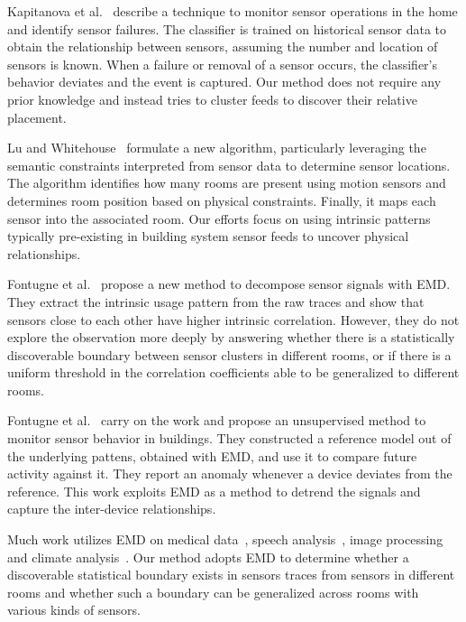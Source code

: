 Kapitanova et al.~\cite{failure} describe a technique to monitor sensor operations in the home and identify sensor failures. 
The classifier is trained on historical sensor data to obtain the relationship between sensors, assuming the number and location of 
sensors is known.  When a failure or removal of a sensor occurs, the classifier's behavior deviates and the event is captured. Our method does not require any prior knowledge and instead tries to cluster feeds to discover their relative placement.

Lu and Whitehouse~\cite{blueprints} formulate a new algorithm, particularly leveraging the semantic constraints interpreted from sensor 
data to determine sensor locations. The algorithm identifies how many rooms are present using motion sensors and determines room position based on physical constraints. Finally, it maps each sensor into the associated room. Our efforts focus on using intrinsic patterns typically pre-existing in building system sensor feeds to uncover physical relationships.

Fontugne et al.~\cite{IOT} propose a new method to decompose sensor signals with EMD.
They extract the intrinsic usage pattern from the raw traces and show that sensors close to each other have higher intrinsic correlation. However, they do not explore the observation more deeply by answering whether there is a statistically discoverable boundary between sensor clusters in different rooms, or if there is a uniform threshold in the correlation coefficients able to be generalized to different rooms.

Fontugne et al.~\cite{SBS} carry on the work and propose an unsupervised method to monitor sensor behavior in buildings. They constructed 
a reference model out of the underlying pattens, obtained with EMD,  and use it to compare future activity against it.  They report an anomaly whenever a device deviates from the reference. This work exploits EMD as a method to detrend the signals and capture the inter-device relationships.

Much work utilizes EMD on medical data~\cite{ecg}, speech analysis~\cite{speech}, image processing~\cite{ip} 
and climate analysis~\cite{climate}. Our method adopts EMD to determine whether a discoverable statistical boundary exists in sensors traces
from sensors in different rooms and whether such a boundary
 can be generalized across rooms with various kinds of sensors.